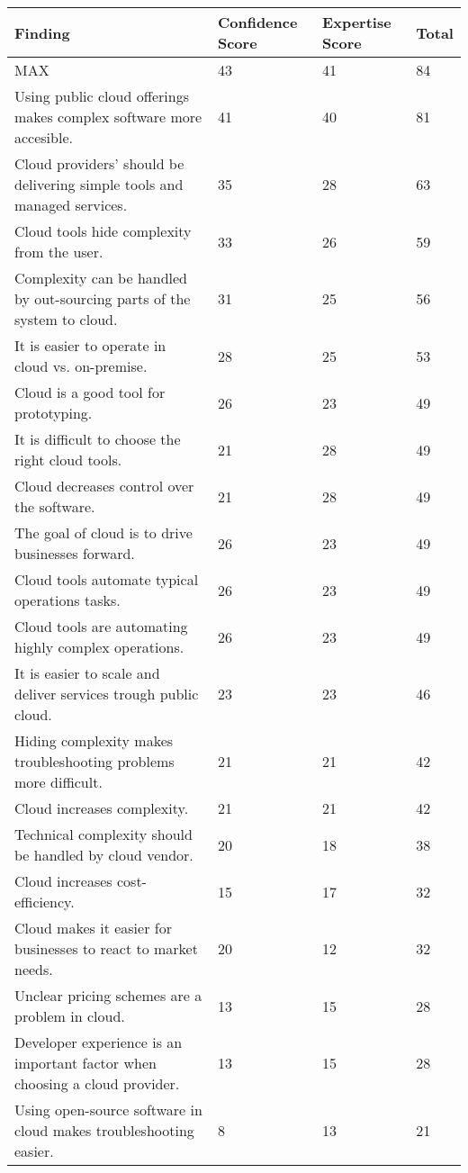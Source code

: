 
\renewcommand\arraystretch{1.5}%
\begin{longtable}{|p{10cm}|p{2cm}|p{2cm}|}
\hline
\textbf{Finding}  & \textbf{Confidence Score} & \textbf{Expertise Score} & \textbf{Total} \\ \hline
\endhead
MAX & 43 & 41 & 84 \\ \hline
Using public cloud offerings makes complex software more accesible. & 41 & 40 & 81 \\ \hline
Cloud providers' should be delivering simple tools and managed services. & 35 & 28 & 63 \\ \hline
Cloud tools hide complexity from the user. & 33 & 26 & 59 \\ \hline
Complexity can be handled by out-sourcing parts of the system to cloud. & 31 & 25 & 56 \\ \hline
It is easier to operate in cloud vs. on-premise. & 28 & 25 & 53 \\ \hline
Cloud is a good tool for prototyping. & 26 & 23 & 49 \\ \hline
It is difficult to choose the right cloud tools. & 21 & 28 & 49 \\ \hline
Cloud decreases control over the software. & 21 & 28 & 49 \\ \hline
The goal of cloud is to drive businesses forward. & 26 & 23 & 49 \\ \hline
Cloud tools automate typical operations tasks. & 26 & 23 & 49 \\ \hline
Cloud tools are automating highly complex operations. & 26 & 23 & 49 \\ \hline
It is easier to scale and deliver services trough public cloud. & 23 & 23 & 46 \\ \hline
Hiding complexity makes troubleshooting problems more difficult. & 21 & 21 & 42 \\ \hline
Cloud increases complexity. & 21 & 21 & 42 \\ \hline
Technical complexity should be handled by cloud vendor. & 20 & 18 & 38 \\ \hline
Cloud increases cost-efficiency. & 15 & 17 & 32 \\ \hline
Cloud makes it easier for businesses to react to market needs. & 20 & 12 & 32 \\ \hline
Unclear pricing schemes are a problem in cloud. & 13 & 15 & 28 \\ \hline
Developer experience is an important factor when choosing a cloud provider. & 13 & 15 & 28 \\ \hline
Using open-source software in cloud makes troubleshooting easier. & 8 & 13 & 21 \\ \hline

\end{longtable}

